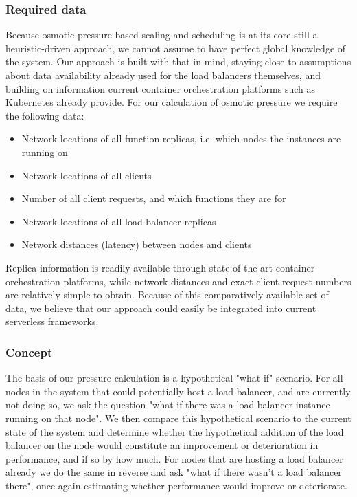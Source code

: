 \documentclass[draft,final]{vutinfth} %
\begin{document}
\subsubsection{Required data}
Because osmotic pressure based scaling and scheduling is at its core still a heuristic-driven approach, we cannot assume to have perfect global knowledge of the system.
Our approach is built with that in mind, staying close to assumptions about data availability already used for the load balancers themselves, and building on information current container orchestration platforms such as Kubernetes already provide.
For our calculation of osmotic pressure we require the following data:
\begin{itemize}
    \item Network locations of all function replicas, i.e. which nodes the instances are running on
    \item Network locations of all clients
    \item Number of all client requests, and which functions they are for
    \item Network locations of all load balancer replicas
    \item Network distances (latency) between nodes and clients
\end{itemize}
Replica information is readily available through state of the art container orchestration platforms, while network distances and exact client request numbers are relatively simple to obtain.
Because of this comparatively available set of data, we believe that our approach could easily be integrated into current serverless frameworks.
\subsubsection{Concept}
The basis of our pressure calculation is a hypothetical "what-if" scenario.
For all nodes in the system that could potentially host a load balancer, and are currently not doing so, we ask the question "what if there was a load balancer instance running on that node".
We then compare this hypothetical scenario to the current state of the system and determine whether the hypothetical addition of the load balancer on the node would constitute an improvement or deterioration in performance, and if so by how much.
For nodes that are hosting a load balancer already we do the same in reverse and ask "what if there wasn't a load balancer there", once again estimating whether performance would improve or deteriorate.
\end{document}

